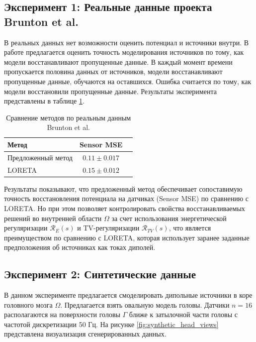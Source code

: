 \documentclass[a4paper,14pt,oneside,openany]{extarticle}
\begin{document}
\subsection{Эксперимент 1: Реальные данные проекта Brunton et al.}
\label{subsec:exp1}

В реальных данных нет возможности оценить потенциал и источники внутри. 
В работе предлагается оценить точность моделирования источников по тому, 
как модели восстанавливают пропущенные данные. 
В каждый момент времени пропускается половина данных от источников, 
модели восстанавливают пропущенные данные, обучаются на оставшихся.
Ошибка считается по тому, как модели восстановили пропущенные данные.
Результаты эксперимента представлены в таблице \ref{tab:brunton_results}.

\begin{table}[h]
\centering
\begin{tabular}{lcc}
\hline
Метод & Sensor MSE\\
\hline
Предложенный метод & $0.11 \pm 0.017$\\
LORETA & $0.15 \pm 0.012$\\
\hline
\end{tabular}
\caption{Сравнение методов по реальным данным Brunton et al.}
\label{tab:brunton_results}
\end{table}

Результаты показывают, что предложенный метод обеспечивает сопоставимую точность 
восстановления потенциала на датчиках (Sensor MSE) по сравнению с LORETA.
Но при этом позволяет контролировать свойства восстанавливаемых решений во внутренней 
области $\Omega$ за счет использования энергетической регуляризации $\mathcal{R}_E(s)$ и
TV-регуляризации $\mathcal{R}_{TV}(s)$, что является преимуществом по сравнению с LORETA, 
которая использует заранее заданные предположения об источниках как токах диполей.

\subsection{Эксперимент 2: Синтетические данные}
\label{subsec:exp2}

В данном эксперименте предлагается смоделировать дипольные источники в коре головного мозга $\Omega$. 
Предлагается взять овальную модель головы. Датчики $n=16$ располагаются на поверхности головы $\Gamma$ 
ближе к затылочной части головы с частотой дискретизации 50 Гц.
На рисунке \ref{fig:synthetic_head_views} представлена визуализация сгенерированных данных.
\end{document}
